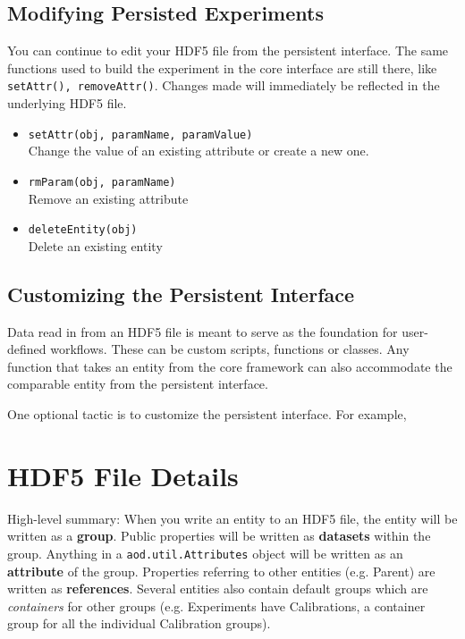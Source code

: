\documentclass[10pt]{exam}
\newcommand\aodclass[1]{\textcolor{codeblue}{\texttt{#1}}}
\newcommand\aodfcn[1]{\textcolor{darkteal}{\texttt{#1}}}
\begin{document}
	\subsection{Modifying Persisted Experiments}
	\noindent You can continue to edit your HDF5 file from the persistent interface. The same functions used to build the experiment in the core interface are still there, like \aodfcn{setAttr(), removeAttr()}. Changes made will immediately be reflected in the underlying HDF5 file. 
	
	\begin{itemize}
		\item \aodfcn{setAttr(obj, paramName, paramValue)}\\
		Change the value of an existing attribute or create a new one. 
		\item \aodfcn{rmParam(obj, paramName)}\\
		Remove an existing attribute
		\item \aodfcn{deleteEntity(obj)}\\
		Delete an existing entity
	\end{itemize}

	\subsection{Customizing the Persistent Interface}
	\noindent Data read in from an HDF5 file is meant to serve as the foundation for user-defined workflows. These can be custom scripts, functions or classes. Any function that takes an entity from the core framework can also accommodate the comparable entity from the persistent interface. 
	
	One optional tactic is to customize the persistent interface. For example,  

\section{HDF5 File Details}
	\label{section:HDF5_Details}
	\noindent High-level summary: When you write an entity to an HDF5 file, the entity will be written as a \textbf{group}. Public properties will be written as  \textbf{datasets} within the group. Anything in a \aodclass{aod.util.Attributes} object will be written as an \textbf{attribute} of the group. Properties referring to other entities (e.g. Parent) are written as \textbf{references}.  Several entities also contain default groups which are \textit{containers} for other groups (e.g. Experiments have Calibrations, a container group for all the individual Calibration groups). 
	
\end{document}
